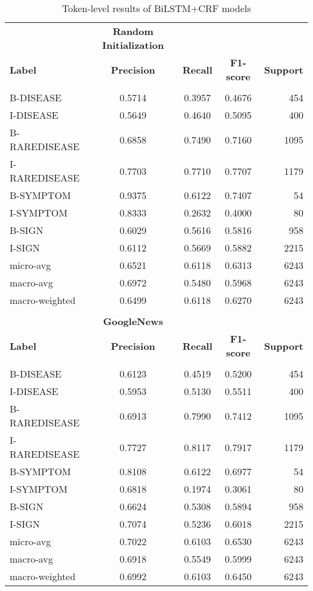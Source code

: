 \documentclass[preprint,12pt]{elsarticle}
\begin{document}
\begin{table}[H]
\centering
\tiny
\caption{\label{tab:tokenBiLSTMCRF}Token-level results of BiLSTM+CRF models}
\begin{tabular}{lcccr}
\\
& \multicolumn{1}{c}{\textbf{Random Initialization}} \\
{\bf Label} & {\bf Precision} &
{\bf Recall} &
{\bf F1-score} & {\bf Support} \\
\hline\\[-8pt]

B-DISEASE	&	0.5714	&	0.3957	&	0.4676	&	454\\
I-DISEASE	&	0.5649	&	0.4640	&	0.5095	&	400\\
B-RAREDISEASE	&	0.6858	&	0.7490	&	0.7160	&	1095\\
I-RAREDISEASE	&	0.7703	&	0.7710	&	0.7707	&	1179\\
B-SYMPTOM	&	0.9375	&	0.6122	&	0.7407	&	54\\
I-SYMPTOM	&	0.8333	&	0.2632	&	0.4000	&	80\\
B-SIGN	&	0.6029	&	0.5616	&	0.5816	&	958\\
I-SIGN	&	0.6112	&	0.5669	&	0.5882	&	2215\\
micro-avg	&	0.6521	&	0.6118	&	0.6313	&	6243\\
macro-avg	&	0.6972	&	0.5480	&	0.5968	&	6243\\
macro-weighted	&	0.6499	&	0.6118	&	0.6270	&	6243\\

\hline
\\
& \multicolumn{1}{c}{\textbf{GoogleNews}} \\
{\bf Label} & {\bf Precision} &
{\bf Recall} &
{\bf F1-score} & {\bf Support} \\
\hline\\[-8pt]

B-DISEASE	&	0.6123	&	0.4519	&	0.5200	&	454\\
I-DISEASE	&	0.5953	&	0.5130	&	0.5511	&	400\\
B-RAREDISEASE	&	0.6913	&	0.7990	&	0.7412	&	1095\\
I-RAREDISEASE	&	0.7727	&	0.8117	&	0.7917	&	1179\\
B-SYMPTOM	&	0.8108	&	0.6122	&	0.6977	&	54\\
I-SYMPTOM	&	0.6818	&	0.1974	&	0.3061	&	80\\
B-SIGN	&	0.6624	&	0.5308	&	0.5894	&	958\\
I-SIGN	&	0.7074	&	0.5236	&	0.6018	&	2215\\
micro-avg	&	0.7022	&	0.6103	&	0.6530	&	6243\\
macro-avg	&	0.6918	&	0.5549	&	0.5999	&	6243\\
macro-weighted	&	0.6992	&	0.6103	&	0.6450	&	6243\\


\end{tabular}
\end{table}
\end{document}
